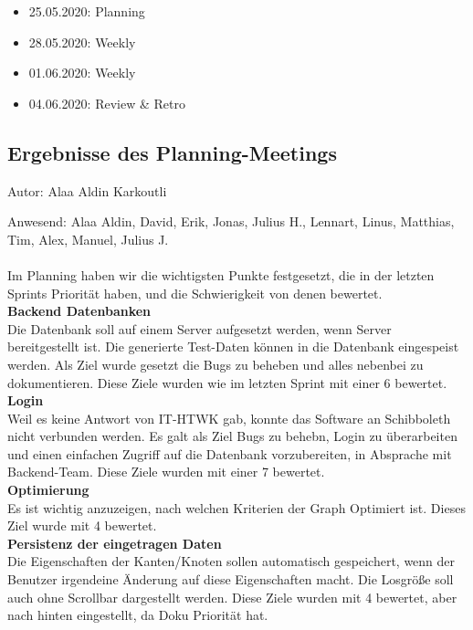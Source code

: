 \begin{itemize}
\item 25.05.2020: Planning
\item 28.05.2020: Weekly
\item 01.06.2020: Weekly
\item 04.06.2020: Review \& Retro
\end{itemize}

\subsection{Ergebnisse des Planning-Meetings}
{\small Autor: Alaa Aldin Karkoutli}

Anwesend: Alaa Aldin, David, Erik, Jonas, Julius H., Lennart, Linus, Matthias, Tim, Alex, Manuel, Julius J.\\
\\
Im Planning haben wir die wichtigsten Punkte festgesetzt, die in der letzten Sprints Priorität haben, und die Schwierigkeit von denen bewertet.\\


\textbf{Backend Datenbanken}\\
Die Datenbank soll auf einem Server aufgesetzt werden, wenn Server bereitgestellt ist.
Die generierte Test-Daten können in die Datenbank eingespeist werden. Als Ziel wurde gesetzt die Bugs zu beheben und alles nebenbei zu dokumentieren. 
Diese Ziele wurden wie im letzten Sprint mit einer 6 bewertet.\\

\textbf{Login}\\
Weil es keine Antwort von IT-HTWK gab, konnte das Software an Schibboleth nicht verbunden werden.
Es galt als Ziel Bugs zu behebn, Login zu überarbeiten und einen einfachen Zugriff auf die Datenbank vorzubereiten, in Absprache mit Backend-Team.
Diese Ziele wurden mit einer 7 bewertet.\\

\textbf{Optimierung}\\
Es ist wichtig anzuzeigen, nach welchen Kriterien der Graph Optimiert ist.
Dieses Ziel wurde mit 4 bewertet.\\

\textbf{Persistenz der eingetragen Daten}\\
Die Eigenschaften der Kanten/Knoten sollen automatisch gespeichert, wenn der Benutzer irgendeine Änderung auf diese Eigenschaften macht.
Die Losgröße soll auch ohne Scrollbar dargestellt werden.
Diese Ziele wurden mit 4 bewertet, aber nach hinten eingestellt, da Doku Priorität hat. \\

